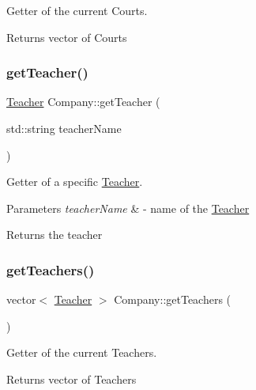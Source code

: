 Getter of the current Courts. 

\begin{DoxyReturn}{Returns}
vector of Courts 
\end{DoxyReturn}
\mbox{\label{class_company_a166411c9ee427d89abd9349191434fbf}} 
\subsubsection{\texorpdfstring{get\+Teacher()}{getTeacher()}}
{\footnotesize\ttfamily \mbox{\hyperlink{class_teacher}{Teacher}} Company\+::get\+Teacher (\begin{DoxyParamCaption}\item[{std\+::string}]{teacher\+Name }\end{DoxyParamCaption})}



Getter of a specific \mbox{\hyperlink{class_teacher}{Teacher}}. 


\begin{DoxyParams}{Parameters}
{\em teacher\+Name} & -\/ name of the \mbox{\hyperlink{class_teacher}{Teacher}} \\
\hline
\end{DoxyParams}
\begin{DoxyReturn}{Returns}
the teacher 
\end{DoxyReturn}
\mbox{\label{class_company_a000159ce012318a6edf0335447ad8bde}} 
\subsubsection{\texorpdfstring{get\+Teachers()}{getTeachers()}}
{\footnotesize\ttfamily vector$<$ \mbox{\hyperlink{class_teacher}{Teacher}} $>$ Company\+::get\+Teachers (\begin{DoxyParamCaption}{ }\end{DoxyParamCaption})}



Getter of the current Teachers. 

\begin{DoxyReturn}{Returns}
vector of Teachers 
\end{DoxyReturn}
\mbox{\label{class_company_a1f222b5e97b060c0603c42e64d7567a6}} 
